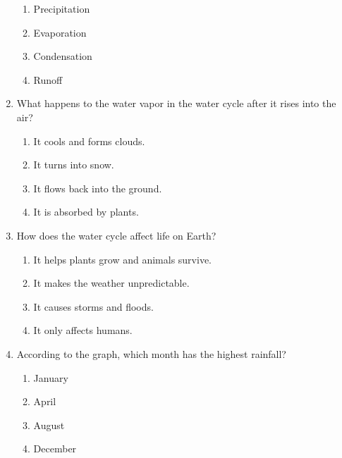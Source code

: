\documentclass[12pt]{article}
\begin{document}
\begin{enumerate}
    \begin{enumerate}[label=\Alph*.]
        \item Precipitation
        \item Evaporation
        \item Condensation
        \item Runoff
    \end{enumerate}

    \vspace{0.5cm}

    \item What happens to the water vapor in the water cycle after it rises into the air?

    \begin{enumerate}[label=\Alph*.]
        \item It cools and forms clouds.
        \item It turns into snow.
        \item It flows back into the ground.
        \item It is absorbed by plants.
    \end{enumerate}

    \vspace{0.5cm}

    \item How does the water cycle affect life on Earth?

    \begin{enumerate}[label=\Alph*.]
        \item It helps plants grow and animals survive.
        \item It makes the weather unpredictable.
        \item It causes storms and floods.
        \item It only affects humans.
    \end{enumerate}

    \vspace{0.5cm}

    \item According to the graph, which month has the highest rainfall?

    \begin{enumerate}[label=\Alph*.]
        \item January
        \item April
        \item August
        \item December
    \end{enumerate}


\end{enumerate}
\end{document}
